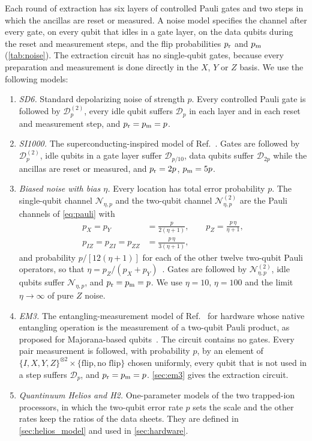 Each round of extraction has six layers of controlled Pauli gates and two steps in which the ancillas are reset or measured. A noise model specifies the channel after every gate, on every qubit that idles in a gate layer, on the data qubits during the reset and measurement steps, and the flip probabilities $p_{\rm r}$ and $p_{\rm m}$ (\autoref{tab:noise}). The extraction circuit has no single-qubit gates, because every preparation and measurement is done directly in the $X$, $Y$ or $Z$ basis. We use the following models:
\begin{enumerate}
  \item \emph{SD6.} Standard depolarizing noise of strength $p$. Every controlled Pauli gate is followed by $\mathcal{D}^{(2)}_p$, every idle qubit suffers $\mathcal{D}_p$ in each layer and in each reset and measurement step, and $p_{\rm r}=p_{\rm m}=p$.
  \item \emph{SI1000.} The superconducting-inspired model of Ref.~\cite{gidney2021honeycomb}. Gates are followed by $\mathcal{D}^{(2)}_p$, idle qubits in a gate layer suffer $\mathcal{D}_{p/10}$, data qubits suffer $\mathcal{D}_{2p}$ while the ancillas are reset or measured, and $p_{\rm r}=2p$, $p_{\rm m}=5p$.
  \item \emph{Biased noise with bias $\eta$.} Every location has total error probability $p$. The single-qubit channel $\mathcal{N}_{\eta,p}$ and the two-qubit channel $\mathcal{N}^{(2)}_{\eta,p}$ are the Pauli channels of \autoref{eq:pauli} with
  \begin{align}
    p_X=p_Y&=\frac{p}{2(\eta+1)},\qquad p_Z=\frac{p\,\eta}{\eta+1},\label{eq:bias1}\\
    p_{IZ}=p_{ZI}=p_{ZZ}&=\frac{p\,\eta}{3(\eta+1)},\label{eq:bias2}
  \end{align}
  and probability $p/[12(\eta+1)]$ for each of the other twelve two-qubit Pauli operators, so that $\eta=p_Z/(p_X+p_Y)$~\cite{tuckett2018}. Gates are followed by $\mathcal{N}^{(2)}_{\eta,p}$, idle qubits suffer $\mathcal{N}_{\eta,p}$, and $p_{\rm r}=p_{\rm m}=p$. We use $\eta=10$, $\eta=100$ and the limit $\eta\to\infty$ of pure $Z$ noise.
  \item \emph{EM3.} The entangling-measurement model of Ref.~\cite{gidney2021honeycomb} for hardware whose native entangling operation is the measurement of a two-qubit Pauli product, as proposed for Majorana-based qubits~\cite{chao2020majorana}. The circuit contains no gates. Every pair measurement is followed, with probability $p$, by an element of $\{I,X,Y,Z\}^{\otimes2}\times\{\text{flip},\text{no flip}\}$ chosen uniformly, every qubit that is not used in a step suffers $\mathcal{D}_p$, and $p_{\rm r}=p_{\rm m}=p$. \autoref{sec:em3} gives the extraction circuit.
  \item \emph{Quantinuum Helios and H2.} One-parameter models of the two trapped-ion processors, in which the two-qubit error rate $p$ sets the scale and the other rates keep the ratios of the data sheets. They are defined in \autoref{sec:helios_model} and used in \autoref{sec:hardware}.
\end{enumerate}

